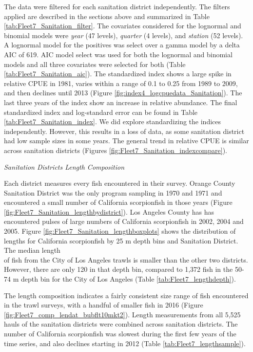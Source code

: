 \documentclass[12pt,]{article}
\begin{document}
The data were filtered for each sanitation district independently. The
filters applied are described in the sections above and summarized in
Table \ref{tab:Fleet7_Sanitation_filter}. The covariates considered for
the lognormal and binomial models were \emph{year} (47 levels),
\emph{quarter} (4 levels), and \emph{station} (52 levels). A lognormal
model for the positives was select over a gamma model by a delta AIC of
619. AIC model select was used for both the lognormal and binomial
models and all three covariates were selected for both (Table
\ref{tab:Fleet7_Sanitation_aic}). The standardized index shows a large
spike in relative CPUE in 1981, varies within a range of 0.1 to 0.25
from 1989 to 2009, and then declines until 2013 (Figure
\ref{fig:index4_logcpuedata_Sanitation}). The last three years of the
index show an increase in relative abundance. The final standardized
index and log-standard error can be found in Table
\ref{tab:Fleet7_Sanitation_index}. We did explore standardizing the
indices independently. However, this results in a loss of data, as some
sanitation district had low sample sizes in some years. The general
trend in relative CPUE is similar across sanitation districts (Figures
\ref{fig:Fleet7_Sanitation_indexcompare}).

\emph{Sanitation Districts Length Composition}

Each district measures every fish encountered in their survey. Orange
County Sanitation District was the only program sampling in 1970 and
1971 and encountered a small number of California scorpionfish in those
years (Figure \ref{fig:Fleet7_Sanitation_lengthbydistrict}). Los Angeles
County has has encountered pulses of large numbers of California
scorpionfish in 2002, 2004 and 2005. Figure
\ref{fig:Fleet7_Sanitation_lengthboxplots} shows the distribution of
lengths for California scorpionfish by 25 m depth bins and Sanitation
District. The median length\\
of fish from the City of Los Angeles trawls is smaller than the other
two districts. However, there are only 120 in that depth bin, compared
to 1,372 fish in the 50-74 m depth bin for the City of Los Angeles
(Table \ref{tab:Fleet7_lengthdepth}).

The length composition indicates a fairly consistent size range of fish
encountered in the trawl surveys, with a handful of smaller fish in 2016
(Figure \ref{fig:Fleet7_comp_lendat_bubflt10mkt2}). Length measurements
from all 5,525 hauls of the sanitation districts were combined across
sanitation districts. The number of California scorpionfish was slowest
during the first few years of the time series, and also declines
starting in 2012 (Table \ref{tab:Fleet7_lengthsample}).
\end{document}
